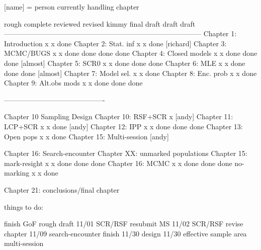 [name] = person currently handling chapter


                          rough   complete reviewed  revised kimmy final 
                          draft    draft                           draft
------------------------------------------------------------------------------------
Chapter 1: Introduction       x       x     done    
Chapter 2: Stat. inf          x       x     done    [richard]
Chapter 3: MCMC/BUGS          x       x     done     done    done   done
Chapter 4: Closed models      x       x     done     done    done   [almost]
Chapter 5: SCR0               x       x     done     done    done
Chapter 6: MLE                x       x     done     done    done   [almost]
Chapter 7: Model sel.         x       x     done   
Chapter 8: Enc. prob          x       x     done
Chapter 9: Alt.obs mods       x       x     done     done    done

-------------------------------------------

Chapter 10 Sampling Design
Chapter 10: RSF+SCR           x    [andy]
Chapter 11: LCP+SCR           x       x     done    [andy]
Chapter 12: IPP               x       x     done     done           done
Chapter 13: Open pops         x       x     done 
Chapter 15: Multi-session     [andy]


Chapter 16: Search-encounter
Chapter XX: unmarked populations
Chapter 15: mark-resight      x       x     done     done           done
Chapter 16: MCMC              x       x     done     done           done
no-marking                    x       x     done

Chapter 21: conclusions/final chapter





things to do:

finish GoF rough draft   11/01
SCR/RSF resubmit MS      11/02
SCR/RSF revise chapter   11/09
search-encounter finish  11/30
design                   11/30
effective sample area  
multi-session
